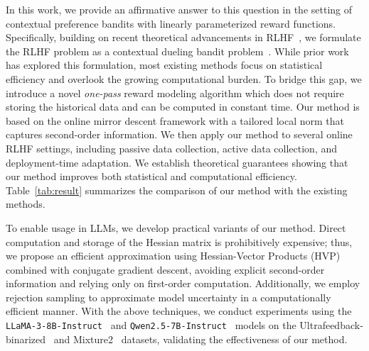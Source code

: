 In this work, we provide an affirmative answer to this question in the setting of contextual preference bandits with linearly parameterized reward functions. Specifically, building on recent theoretical advancements in RLHF~\citep{ICML'23:Zhu-Principled,arXiv'24:Das-RLHF-active,arXiv'24:Ji-RLHF-active}, we formulate the RLHF problem as a contextual dueling bandit problem~\citep{JCSS'12:K-armed-dueling-bandits,NeurIPS'21:Saha-Preference-bandits}. While prior work has explored this formulation, most existing methods focus on statistical efficiency and overlook the growing computational burden. To bridge this gap, we introduce a novel \emph{one-pass} reward modeling algorithm which does not require storing the historical data and can be computed in constant time. Our method is based on the online mirror descent framework with a tailored local norm that captures second-order information. We then apply our method to several online RLHF settings, including passive data collection, active data collection, and deployment-time adaptation. We establish theoretical guarantees showing that our method improves both statistical and computational efficiency. Table~\ref{tab:result} summarizes the comparison of our method with the existing methods.


To enable usage in LLMs, we develop practical variants of our method. Direct computation and storage of the Hessian matrix is prohibitively expensive; thus, we propose an efficient approximation using Hessian-Vector Products (HVP) combined with conjugate gradient descent, avoiding explicit second-order information and relying only on first-order computation. Additionally, we employ rejection sampling to approximate model uncertainty in a computationally efficient manner. With the above techniques, we conduct experiments using the \texttt{LLaMA-3-8B-Instruct}~\citep{arXiv'24:llama-3} and \texttt{Qwen2.5-7B-Instruct}~\citep{arXiv'24:Qwen-2.5} models on the Ultrafeedback-binarized~\citep{arXiv'23:Ultrafeedback} and Mixture2~\citep{TMLR'24:Dong-RLHF} datasets, validating the effectiveness of our method.

